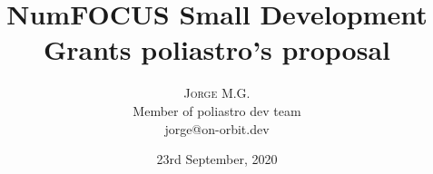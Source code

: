 \setlength{\droptitle}{-4\baselineskip} %

\pretitle{\begin{center}\Huge\bfseries} %
\posttitle{\end{center}} %
\title{
  NumFOCUS Small Development Grants poliastro's proposal
} %
\author{
\textsc{
  Jorge M.G.
}\\[1ex] %
\normalsize Member of poliastro dev team \\
\normalsize jorge@on-orbit.dev
}

\date{
  23rd September, 2020
} %

\renewcommand{\maketitlehookd}{
\begin{abstract}
	Third round for NumFOCUS Small Development Grant is open till October
	19, 2020. During this period, sponsored or affilliated organizations
	might apply in order to benefit from stippends which can be up to
	$5000\$$. Proposed work must be achieved within 2021 year and money can
	be used for code and documentation improvements, workshops or other kind
	of activities which promote or enhance open-source project. This report
	presents a collection of ideas, tasks and new implementations for the
	poliastro project in order to apply for this last round of NumFOCUS
	sustainability program.
\end{abstract}
}


